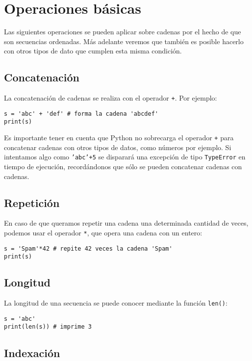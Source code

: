 \section{Operaciones básicas}

Las siguientes operaciones se pueden aplicar sobre cadenas por el hecho de que son secuencias ordenadas. Más adelante veremos que también es posible hacerlo con otros tipos de dato que cumplen esta misma condición.

\subsection{Concatenación}

La concatenación de cadenas se realiza con el operador \texttt{+}. Por ejemplo:

\begin{lstlisting}
s = 'abc' + 'def' # forma la cadena 'abcdef'
print(s)
\end{lstlisting}

Es importante tener en cuenta que Python no sobrecarga el operador \texttt{+} para concatenar cadenas con otros tipos de datos, como números por ejemplo. Si intentamos algo como \texttt{'abc'+5} se disparará una excepción de tipo \texttt{TypeError} en tiempo de ejecución, recordándonos que sólo se pueden concatenar cadenas con cadenas.

\subsection{Repetición}

En caso de que queramos repetir una cadena una determinada cantidad de veces, podemos usar el operador \texttt{*}, que opera una cadena con un entero:

\begin{lstlisting}
s = 'Spam'*42 # repite 42 veces la cadena 'Spam' 
print(s)
\end{lstlisting}

\subsection{Longitud}

La longitud de una secuencia se puede conocer mediante la función \texttt{len()}:

\begin{lstlisting}
s = 'abc'
print(len(s)) # imprime 3
\end{lstlisting}

\subsection{Indexación}

